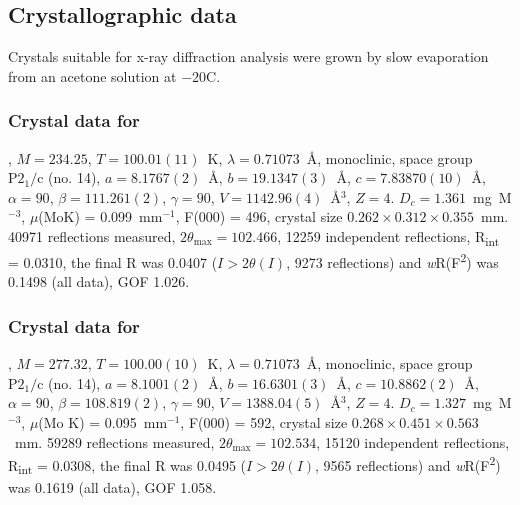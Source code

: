 \begin{refsection}
\subsection{Crystallographic data}
Crystals suitable for x-ray diffraction analysis were grown by slow evaporation from an acetone solution at $-20$\degree{}C.

\subsubsection{Crystal data for \texorpdfstring{}{C12 H14 N2 O3}}
, $M=234.25$, $T=100.01(11)$~K, $\lambda=0.71073$~\AA, monoclinic, space group $\text{P}2_1/\text{c}$ (no. 14), $a = 8.1767(2)$~\AA, $b = 19.1347(3)$~\AA, $c = 7.83870(10)$~\AA, $\alpha = 90$\degree, $\beta = 111.261(2)$\degree, $\gamma = 90$\degree, $V = 1142.96(4)$~\AA$^{3}$, $Z = 4$. $D_{c}= 1.361$~mg~M$^{-3}$, $\mu$(MoK\a) = 0.099~mm$^{-1}$, F(000) = 496, crystal size $0.262 \times 0.312 \times 0.355$~mm. 40971 reflections measured, $2\theta_{\max}=102.466$\degree, 12259 independent reflections, R\textsubscript{int} = 0.0310, the final R was 0.0407 ($I > 2\theta(I)$, 9273 reflections) and \emph{w}R(F\textsuperscript{2}) was 0.1498 (all data), GOF 1.026. 

\subsubsection{Crystal data for \texorpdfstring{}{C14 H19 N3 O3}}
, $M=277.32$, $T=100.00(10)$~K, $\lambda=0.71073$~\AA, monoclinic, space group $\text{P}2_1/\text{c}$ (no. 14), $a = 8.1001(2)$~\AA, $b = 16.6301(3)$~\AA, $c = 10.8862(2)$~\AA, $\alpha = 90$\degree, $\beta = 108.819(2)$\degree, $\gamma = 90$\degree, $V = 1388.04(5)$~\AA$^{3}$, $Z = 4$. $D_{c}= 1.327$~mg~M$^{-3}$, $\mu$(Mo K\a) = 0.095~mm$^{-1}$, F(000) = 592, crystal size $0.268 \times 0.451 \times 0.563$~mm. 59289 reflections measured, $2\theta_{\max}=102.534$\degree, 15120 independent reflections, R\textsubscript{int} = 0.0308, the final R was 0.0495 ($I > 2\theta(I)$, 9565 reflections) and \emph{w}R(F\textsuperscript{2}) was 0.1619 (all data), GOF 1.058. 


\end{refsection}
